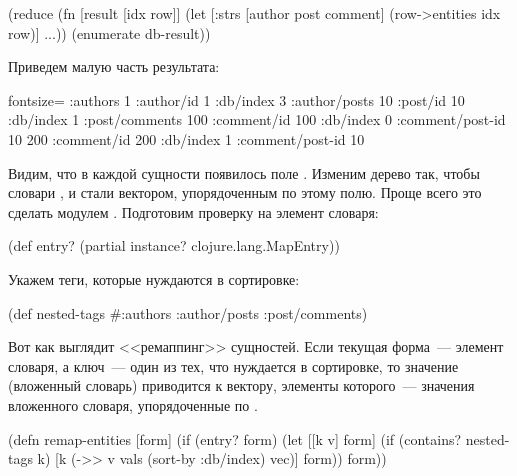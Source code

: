 \begin{english}
  \begin{clojure}
(reduce
 (fn [result [idx row]]
   (let [{:strs [author post comment]}
         (row->entities idx row)]
     ...))
 {}
 (enumerate db-result))
  \end{clojure}
\end{english}

Приведем малую часть результата:

\begin{english}
  \begin{clojure*}{fontsize=\small}
{:authors
 {1 {:author/id 1
     :db/index 3
     :author/posts
     {10 {:post/id 10
          :db/index 1
          :post/comments
          {100 {:comment/id 100
                :db/index 0
                :comment/post-id 10}
           200 {:comment/id 200
                :db/index 1
                :comment/post-id 10}}}}}}}
  \end{clojure*}
\end{english}

Видим, что в каждой сущности появилось поле . Изменим дерево так, чтобы словари ,  и  стали вектором, упорядоченным по этому полю. Проще всего это сделать модулем . Подготовим проверку на элемент словаря:

\begin{english}
  \begin{clojure}
(def entry?
  (partial instance? clojure.lang.MapEntry))
  \end{clojure}
\end{english}

Укажем теги, которые нуждаются в сортировке:

\begin{english}
  \begin{clojure}
(def nested-tags
  #{:authors :author/posts :post/comments})
  \end{clojure}
\end{english}

Вот как выглядит <<ремаппинг>> сущностей. Если текущая форма~--- элемент словаря, а ключ~--- один из тех, что нуждается в сортировке, то значение (вложенный словарь) приводится к вектору, элементы которого~--- значения вложенного словаря, упорядоченные по .

\begin{english}
  \begin{clojure}
(defn remap-entities
  [form]
  (if (entry? form)
    (let [[k v] form]
      (if (contains? nested-tags k)
        [k (->> v vals (sort-by :db/index) vec)]
        form))
    form))
  \end{clojure}
\end{english}

